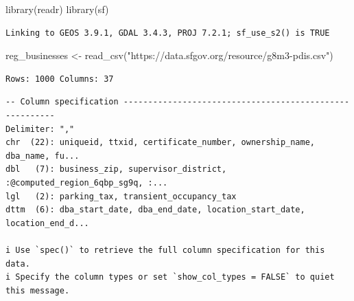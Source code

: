 \documentclass[
  letterpaper,
  DIV=11,
  numbers=noendperiod]{scrreprt}
\newenvironment{Shaded}{\begin{snugshade}}{\end{snugshade}}
\newcommand{\FunctionTok}[1]{\textcolor[rgb]{0.28,0.35,0.67}{#1}}
\newcommand{\NormalTok}[1]{\textcolor[rgb]{0.00,0.23,0.31}{#1}}
\newcommand{\OtherTok}[1]{\textcolor[rgb]{0.00,0.23,0.31}{#1}}
\newcommand{\StringTok}[1]{\textcolor[rgb]{0.13,0.47,0.30}{#1}}
\begin{document}
\begin{Shaded}
\begin{Highlighting}[]
\FunctionTok{library}\NormalTok{(readr)}
\FunctionTok{library}\NormalTok{(sf)}
\end{Highlighting}
\end{Shaded}

\begin{verbatim}
Linking to GEOS 3.9.1, GDAL 3.4.3, PROJ 7.2.1; sf_use_s2() is TRUE
\end{verbatim}

\begin{Shaded}
\begin{Highlighting}[]
\NormalTok{reg\_businesses }\OtherTok{\textless{}{-}} \FunctionTok{read\_csv}\NormalTok{(}\StringTok{"https://data.sfgov.org/resource/g8m3{-}pdis.csv"}\NormalTok{)}
\end{Highlighting}
\end{Shaded}

\begin{verbatim}
Rows: 1000 Columns: 37
\end{verbatim}

\begin{verbatim}
-- Column specification --------------------------------------------------------
Delimiter: ","
chr  (22): uniqueid, ttxid, certificate_number, ownership_name, dba_name, fu...
dbl   (7): business_zip, supervisor_district, :@computed_region_6qbp_sg9q, :...
lgl   (2): parking_tax, transient_occupancy_tax
dttm  (6): dba_start_date, dba_end_date, location_start_date, location_end_d...

i Use `spec()` to retrieve the full column specification for this data.
i Specify the column types or set `show_col_types = FALSE` to quiet this message.
\end{verbatim}
\end{document}
